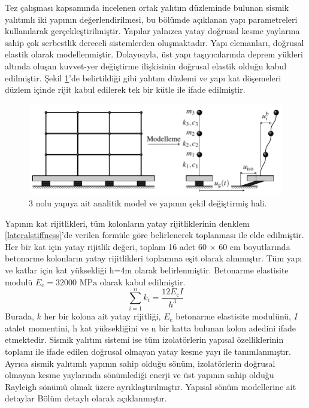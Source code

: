 \label{StructuralProperties} Tez çalışması kapsamında incelenen ortak
yalıtım düzleminde bulunan sismik yalıtımlı iki yapının değerlendirilmesi,
bu bölümde açıklanan yapı parametreleri kullanılarak gerçekleştirilmiştir.
Yapılar yalnızca yatay doğrusal kesme yaylarına sahip çok serbestlik
dereceli sistemlerden oluşmaktadır. Yapı elemanları, doğrusal elastik
olarak modellenmiştir. Dolayısıyla, üst yapı taşıyıcılarında deprem
yükleri altında oluşan kuvvet-yer değiştirme ilişkisinin doğrusal
elastik olduğu kabul edilmiştir. Şekil \ref{fig:structuralmodel}'de
belirtildiği gibi yalıtım düzlemi ve yapı kat döşemeleri düzlem içinde
rijit kabul edilerek tek bir kütle ile ifade edilmiştir. 
\begin{figure}[h!]
\centering{}\includegraphics{TikZ/StructuralModel} \caption{\label{fig:structuralmodel}3 nolu yapıya ait analitik model ve yapının
şekil değiştirmiş hali.}
 
\end{figure}

Yapının kat rijitlikleri, tüm kolonların yatay rijitliklerinin denklem
\ref{lateralstiffness}'de verilen formüle göre belirlenerek toplanması
ile elde edilmiştir. Her bir kat için yatay rijitlik değeri, toplam
16 adet 60 $\times$ 60 cm boyutlarında betonarme kolonların yatay
rijitlikleri toplamına eşit olarak alınmıştır. Tüm yapı ve katlar
için kat yüksekliği h=4m olarak belirlenmiştir. Betonarme elastisite
modulü $E_{\text{c}}=32000\text{ MPa}$ olarak kabul edilmiştir. 
\begin{equation}
\sum\limits _{i=1}^{n}k_{i}=\dfrac{12E_{\text{c}}I}{h^{3}}\label{lateralstiffness}
\end{equation}
Burada, $k$ her bir kolona ait yatay rijitliği, $E_{\text{c}}$ betonarme
elastisite modulünü, $I$ atalet momentini, h kat yüksekliğini ve
n bir katta bulunan kolon adedini ifade etmektedir. Sismik yalıtım
sistemi ise tüm izolatörlerin yapısal özelliklerinin toplamı ile ifade
edilen doğrusal olmayan yatay kesme yayı ile tanımlanmıştır. Ayrıca
sismik yalıtımlı yapının sahip olduğu sönüm, izolatörlerin doğrusal
olmayan kesme yaylarında sönümlediği enerji ve üst yapının sahip olduğu
Rayleigh sönümü olmak üzere ayrıklaştırılmıştır. Yapısal sönüm modellerine
ait detaylar Bölüm detaylı olarak açıklanmıştır.

